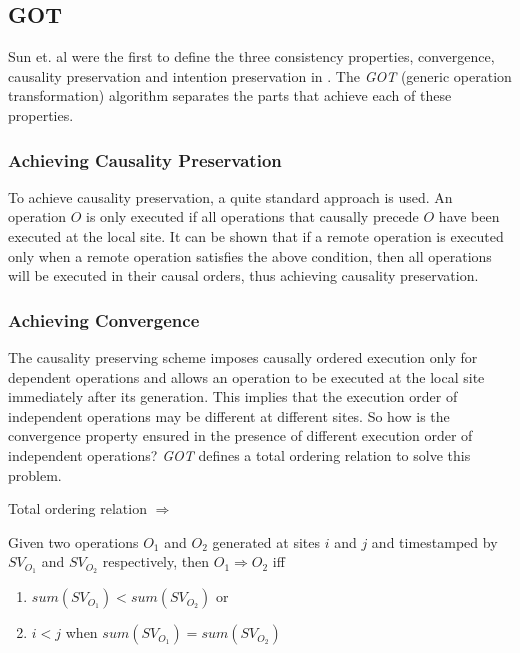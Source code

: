 \subsection{GOT}
\label{algo:got}

Sun et. al were the first to define the three consistency properties, convergence, causality preservation and intention preservation in \cite{sun98a}.  The \emph{GOT} (generic operation transformation) algorithm separates the parts that achieve each of these properties.

\subsubsection{Achieving Causality Preservation}
To achieve causality preservation, a quite standard approach is used. An operation $O$ is only executed if all operations that causally precede $O$ have been executed at the local site. It can be shown that if a remote operation is executed only when a remote operation satisfies the above condition, then all operations will be executed in their causal orders, thus achieving causality preservation.

\subsubsection{Achieving Convergence}
The causality preserving scheme imposes causally ordered execution only for dependent operations and allows an operation to be executed at the local site immediately after its generation. This implies that the execution order of independent operations may be different at different sites. So how is the convergence property ensured in the presence of different execution order of independent operations? \emph{GOT} defines a total ordering relation to solve this problem.

\begin{defn}
Total ordering relation $\Rightarrow$
\end{defn}

Given two operations $O_{1}$ and $O_{2}$ generated at sites $i$ and $j$ and timestamped by $SV_{O_{1}}$ and $SV_{O_{2}}$ respectively, then $O_{1} \Rightarrow O_{2}$ iff

\begin{enumerate}
 \item $sum(SV_{O_{1}}) < sum(SV_{O_{2}})$ or
 \item $i < j$ when $sum(SV_{O_{1}}) = sum(SV_{O_{2}})$
\end{enumerate}

